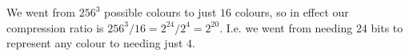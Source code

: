 \begin{answer}
We went from $256^3$ possible colours to just $16$ colours, so in effect our compression ratio is $256^3 / 16 = 2^24/2^4 = 2^20$. I.e. we went from needing $24$ bits to represent any colour to needing just $4$.
\end{answer}
